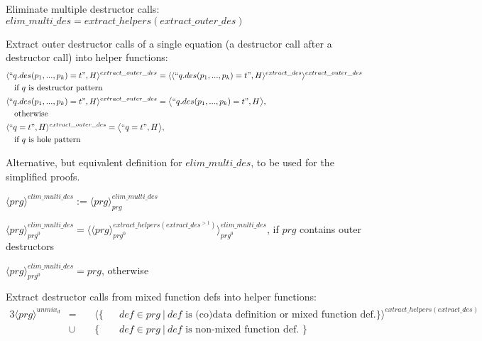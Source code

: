 \documentclass[11pt]{article} %
\begin{document}
Eliminate multiple destructor calls: $elim\_multi\_des = extract\_helpers(extract\_outer\_des)$

Extract outer destructor calls of a single equation (a destructor call after a destructor call) into helper functions:
\begin{alignat*}{2}
& \langle `` q.des(p_1, ..., p_k) = t ", H \rangle^{extract\_outer\_des} = \langle \langle `` q.des(p_1, ..., p_k) = t ", H \rangle^{extract\_des} \rangle^{extract\_outer\_des} \\
&\quad \textrm{if $q$ is destructor pattern } \\
& \langle `` q.des(p_1, ..., p_k) = t ", H \rangle^{extract\_outer\_des} = \big\langle `` q.des(p_1, ..., p_k) = t ", H \big\rangle, \\
&\quad \textrm{otherwise} \\
& \langle `` q = t ", H \rangle^{extract\_outer\_des} = \big\langle `` q = t ", H \big\rangle, \\
&\quad \textrm{if $q$ is hole pattern}
\end{alignat*}

\begin{framed}
Alternative, but equivalent definition for $elim\_multi\_des$, to be used for the simplified proofs.

$\langle prg \rangle^{elim\_multi\_des} := \langle prg \rangle^{elim\_multi\_des}_{prg}$

$\langle prg \rangle^{elim\_multi\_des}_{prg^0} = \langle \langle prg \rangle^{extract\_helpers(extract\_des^{>1})}_{prg^0} \rangle^{elim\_multi\_des}_{prg^0}$, if $prg$ contains outer destructors

$\langle prg \rangle^{elim\_multi\_des}_{prg^0} = prg$, otherwise

\end{framed}

Extract destructor calls from mixed function defs into helper functions:
\begin{alignat*}{3}
\langle prg \rangle^{unmix_d} & = ~&& \langle \{ && def \in prg ~ | ~ def \textrm{ is (co)data definition or mixed function def.} \} \rangle^{extract\_helpers(extract\_des)} \\
&\cup && \{ && def \in prg ~ | ~ def \textrm{ is non-mixed function def. } \}
\end{alignat*}
\end{document}
